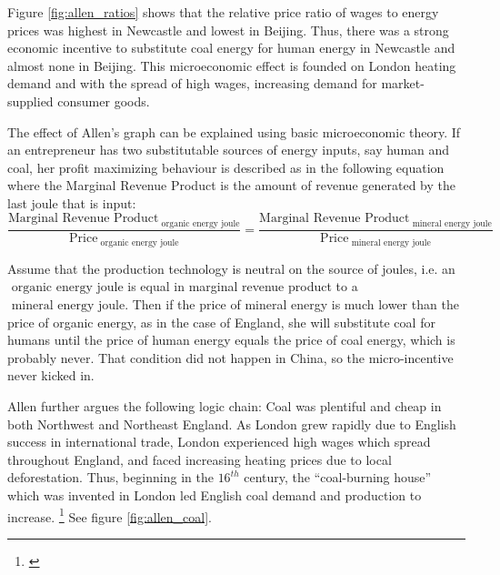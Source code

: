 \documentclass[12pt]{article}
\numberwithin{equation}{section}
\begin{document}
		Figure \ref{fig:allen_ratios} shows that the relative price ratio of wages to energy prices was highest in Newcastle and lowest in Beijing. Thus, there was a strong economic incentive to substitute coal energy for human energy in Newcastle and almost none in Beijing. This microeconomic effect is founded on London heating demand and with the spread of high wages, increasing demand for market-supplied consumer goods.
		
		The effect of Allen's graph can be explained using basic microeconomic theory. If an entrepreneur has two substitutable sources of energy inputs, say human and coal, her profit maximizing behaviour is described as in the following equation where the Marginal Revenue Product is the amount of revenue generated by the last joule that is input:
		\begin{equation}
		\frac{\text{Marginal Revenue Product}_{\text{ organic energy joule}}}{\text{Price}_{\text{ organic energy joule}}} = \frac{\text{Marginal Revenue Product}_{\text{ mineral energy joule}}}{\text{Price}_{\text{ mineral energy joule}}}
		\end{equation}
		
		Assume that the production technology is neutral on the source of joules, i.e. an $\text{ organic energy joule}$ is equal in marginal revenue product to a $\text{ mineral energy joule}$. Then if the price of mineral energy is much lower than the price of organic energy, as in the case of England, she will substitute coal for humans until the price of human energy equals the price of coal energy, which is probably never. That condition did not happen in China, so the micro-incentive never kicked in.
		
		Allen further argues the following logic chain: Coal was plentiful and cheap in both Northwest and Northeast England. As London grew rapidly due to English success in international trade, London experienced high wages which spread throughout England, and faced increasing heating prices due to local deforestation. Thus, beginning in the $16^{th}$ century, the ``coal-burning house'' which was invented in London led English coal demand and production to increase. \footnote{\citet[p.~82]{allen_british_2009}}  See figure \ref{fig:allen_coal}.
		
\end{document}
